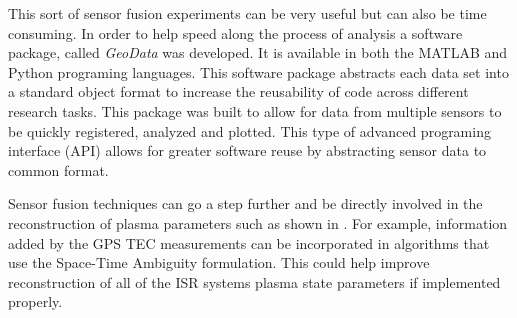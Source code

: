 This sort of sensor fusion experiments can be very useful but can also be time consuming. In order to help speed along the process of analysis a software package, called \textit{GeoData} was developed. It is available in both the MATLAB \cite{john_swoboda_2016_154536} 
and Python \cite{john_swoboda_2016_154533} programing languages. This software package abstracts each data set into a standard object format to increase the reusability of code across different research tasks. This package was built to allow for data from multiple sensors to be quickly registered, analyzed and plotted. This type of advanced programing interface (API) allows for greater software reuse by abstracting sensor data to common format.

Sensor fusion techniques can go a step further and be directly involved in the reconstruction of plasma parameters such as shown in \cite{Semeter:2016gm}. For example, information added by the GPS TEC measurements can be incorporated in algorithms that use the Space-Time Ambiguity formulation. This could help improve reconstruction of all of the ISR systems plasma state parameters if implemented properly.
